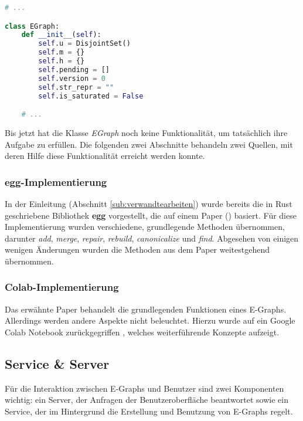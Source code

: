 \begin{lstlisting}[language=Python, caption=Klasse \textit{EGraph}]
# ... 

class EGraph:
    def __init__(self):
        self.u = DisjointSet()
        self.m = {}
        self.h = {}
        self.pending = []
        self.version = 0
        self.str_repr = ""
        self.is_saturated = False

    # ...
\end{lstlisting} 

Bis jetzt hat die Klasse \textit{EGraph} noch keine Funktionalität, um tatsächlich ihre Aufgabe zu erfüllen. Die folgenden zwei Abschnitte 
behandeln zwei Quellen, mit deren Hilfe diese Funktionalität erreicht werden konnte.

\subsubsection{egg-Implementierung}\label{subsub:egg}

In der Einleitung (Abschnitt \ref{sub:verwandtearbeiten}) wurde bereits die in Rust geschriebene Bibliothek \textbf{egg} vorgestellt, die auf einem Paper (\cite{2021-egg}) basiert.
Für diese Implementierung wurden verschiedene, grundlegende Methoden übernommen, darunter \textit{add}, \textit{merge}, \textit{repair}, \textit{rebuild}, \textit{canonicalize} und
\textit{find}. Abgesehen von einigen wenigen Änderungen wurden die Methoden aus dem Paper weitestgehend übernommen.



\subsubsection{Colab-Implementierung}\label{subsub:colab}

Das erwähnte Paper behandelt die grundlegenden Funktionen eines E-Graphs. Allerdings werden andere Aspekte nicht beleuchtet. Hierzu wurde auf ein Google Colab Notebook zurückgegriffen \cite{devito},
welches weiterführende Konzepte aufzeigt.



\subsection{Service \& Server}

Für die Interaktion zwischen E-Graphs und Benutzer sind zwei Komponenten wichtig: ein Server, der Anfragen der Benutzeroberfläche beantwortet sowie ein Service, der im Hintergrund
die Erstellung und Benutzung von E-Graphs regelt.

